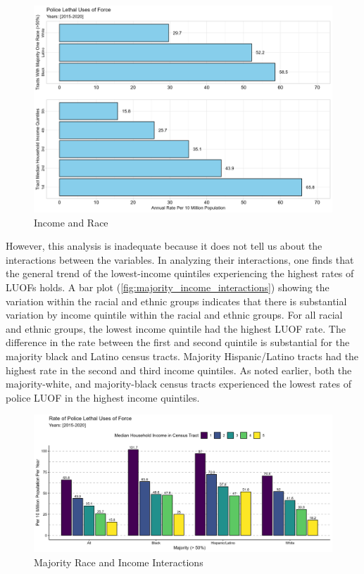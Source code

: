 \documentclass[12pt]{article}
\begin{document}
\begin{figure}[H]
  \centering %
  \includegraphics[width=\linewidth]{images/combined}
  \captionsetup{justification=centering, singlelinecheck=false, margin=2cm}
  \caption[Income and Race]{Income and Race}
  \label{fig:combined}
\end{figure}

However, this analysis is inadequate because it does not tell us about the interactions between the variables. In analyzing their interactions, one finds that the general trend of the lowest-income quintiles experiencing the highest rates of LUOFs holds. A bar plot (\autoref{fig:majority_income_interactions}) showing the variation within the racial and ethnic groups indicates that there is substantial variation by income quintile within the racial and ethnic groups. For all racial and ethnic groups, the lowest income quintile had the highest LUOF rate. The difference in the rate between the first and second quintile is substantial for the majority black and Latino census tracts. Majority Hispanic/Latino tracts had the highest rate in the second and third income quintiles. As noted earlier, both the majority-white, and majority-black census tracts experienced the lowest rates of police LUOF in the highest income quintiles.

\begin{figure}[H]
  \centering %
  \includegraphics[width=\linewidth]{images/race_only_denom_race}
  \captionsetup{justification=centering, singlelinecheck=false, margin=2cm}
  \caption[Majority Race and Income Interactions]{Majority Race and Income Interactions}
  \label{fig:majority_income_interactions}
\end{figure}
\end{document}
